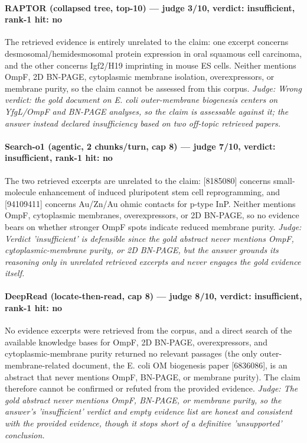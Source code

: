 \documentclass[sigconf, review, anonymous]{acmart}
\begin{document}
\paragraph{RAPTOR (collapsed tree, top-10) --- judge 3/10, verdict: insufficient, rank-1 hit: no}
\noindent The retrieved evidence is entirely unrelated to the claim: one excerpt concerns desmosomal/hemidesmosomal protein expression in oral squamous cell carcinoma, and the other concerns Igf2/H19 imprinting in mouse ES cells. Neither mentions OmpF, 2D BN-PAGE, cytoplasmic membrane isolation, overexpressors, or membrane purity, so the claim cannot be assessed from this corpus.
\noindent\small\textit{Judge: Wrong verdict: the gold document on E. coli outer-membrane biogenesis centers on YfgL/OmpF and BN-PAGE analyses, so the claim is assessable against it; the answer instead declared insufficiency based on two off-topic retrieved papers.}
\paragraph{Search-o1 (agentic, 2 chunks/turn, cap 8) --- judge 7/10, verdict: insufficient, rank-1 hit: no}
\noindent The two retrieved excerpts are unrelated to the claim: [8185080] concerns small-molecule enhancement of induced pluripotent stem cell reprogramming, and [94109411] concerns Au/Zn/Au ohmic contacts for p-type InP. Neither mentions OmpF, cytoplasmic membranes, overexpressors, or 2D BN-PAGE, so no evidence bears on whether stronger OmpF spots indicate reduced membrane purity.
\noindent\small\textit{Judge: Verdict 'insufficient' is defensible since the gold abstract never mentions OmpF, cytoplasmic-membrane purity, or 2D BN-PAGE, but the answer grounds its reasoning only in unrelated retrieved excerpts and never engages the gold evidence itself.}
\paragraph{DeepRead (locate-then-read, cap 8) --- judge 8/10, verdict: insufficient, rank-1 hit: no}
\noindent No evidence excerpts were retrieved from the corpus, and a direct search of the available knowledge bases for OmpF, 2D BN-PAGE, overexpressors, and cytoplasmic-membrane purity returned no relevant passages (the only outer-membrane-related document, the E. coli OM biogenesis paper [6836086], is an abstract that never mentions OmpF, BN-PAGE, or membrane purity). The claim therefore cannot be confirmed or refuted from the provided evidence.
\noindent\small\textit{Judge: The gold abstract never mentions OmpF, BN-PAGE, or membrane purity, so the answer's 'insufficient' verdict and empty evidence list are honest and consistent with the provided evidence, though it stops short of a definitive 'unsupported' conclusion.}
\end{document}
